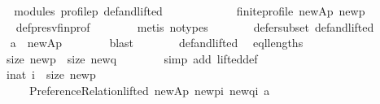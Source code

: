\begin{isabellebody}
\ \ \ \ \isamarkupfalse%
\ \isamarkupfalse%
\ modules\ profile{\isacharunderscore}{\kern0pt}p\ def{\isacharunderscore}{\kern0pt}and{\isacharunderscore}{\kern0pt}lifted\isanewline
\ \ \ \ \isamarkupfalse%
\ {}{\isacharcolon}{\kern0pt}\isanewline
\ \ \ \ \ \ {\isachardoublequoteopen}finite{\isacharunderscore}{\kern0pt}profile\ {\isacharquery}{\kern0pt}new{\isacharunderscore}{\kern0pt}Ap\ {\isacharquery}{\kern0pt}new{\isacharunderscore}{\kern0pt}p{\isachardoublequoteclose}\isanewline
\ \ \ \ \ \ \isamarkupfalse%
\ def{\isacharunderscore}{\kern0pt}presv{\isacharunderscore}{\kern0pt}fin{\isacharunderscore}{\kern0pt}prof\isanewline
\ \ \ \ \ \ \isamarkupfalse%
\ {\isacharparenleft}{\kern0pt}metis\ {\isacharparenleft}{\kern0pt}no{\isacharunderscore}{\kern0pt}types{\isacharparenright}{\kern0pt}{\isacharparenright}{\kern0pt}\isanewline
\ \ \ \ \isamarkupfalse%
\ \isamarkupfalse%
\ defer{\isacharunderscore}{\kern0pt}subset\ def{\isacharunderscore}{\kern0pt}and{\isacharunderscore}{\kern0pt}lifted\isanewline
\ \ \ \ \isamarkupfalse%
\ {}{\isacharcolon}{\kern0pt}\ {\isachardoublequoteopen}a\ {\isasymin}\ {\isacharquery}{\kern0pt}new{\isacharunderscore}{\kern0pt}Ap{\isachardoublequoteclose}\isanewline
\ \ \ \ \ \ \isamarkupfalse%
\ blast\isanewline
\ \ \ \ \isamarkupfalse%
\ \isamarkupfalse%
\ def{\isacharunderscore}{\kern0pt}and{\isacharunderscore}{\kern0pt}lifted\ \isamarkupfalse%
\ eql{\isacharunderscore}{\kern0pt}lengths{\isacharcolon}{\kern0pt}\isanewline
\ \ \ \ \ \ {\isachardoublequoteopen}size\ {\isacharquery}{\kern0pt}new{\isacharunderscore}{\kern0pt}p\ {\isacharequal}{\kern0pt}\ size\ {\isacharquery}{\kern0pt}new{\isacharunderscore}{\kern0pt}q{\isachardoublequoteclose}\isanewline
\ \ \ \ \ \ \isamarkupfalse%
\ {\isacharparenleft}{\kern0pt}simp\ add{\isacharcolon}{\kern0pt}\ lifted{\isacharunderscore}{\kern0pt}def{\isacharparenright}{\kern0pt}\isanewline
\ \ \ \ \isamarkupfalse%
\ \isamarkupfalse%
\ {}{\isacharcolon}{\kern0pt}\isanewline
\ \ \ \ \ \ {\isachardoublequoteopen}{\isacharparenleft}{\kern0pt}{\isasymforall}i{\isacharcolon}{\kern0pt}{\isacharcolon}{\kern0pt}nat{\isachardot}{\kern0pt}\ i\ {\isacharless}{\kern0pt}\ size\ {\isacharquery}{\kern0pt}new{\isacharunderscore}{\kern0pt}p\ {\isasymlongrightarrow}\isanewline
\ \ \ \ \ \ \ \ \ \ {\isasymnot}Preference{\isacharunderscore}{\kern0pt}Relation{\isachardot}{\kern0pt}lifted\ {\isacharquery}{\kern0pt}new{\isacharunderscore}{\kern0pt}Ap\ {\isacharparenleft}{\kern0pt}{\isacharquery}{\kern0pt}new{\isacharunderscore}{\kern0pt}p{\isacharbang}{\kern0pt}i{\isacharparenright}{\kern0pt}\ {\isacharparenleft}{\kern0pt}{\isacharquery}{\kern0pt}new{\isacharunderscore}{\kern0pt}q{\isacharbang}{\kern0pt}i{\isacharparenright}{\kern0pt}\ a{\isacharparenright}{\kern0pt}\ {\isasymor}\isanewline

\end{isabellebody}
